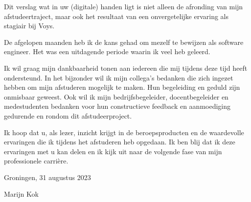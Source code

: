 \documentclass[../report.tex]{subfiles}
\begin{document}
Dit verslag wat in uw (digitale) handen ligt is niet alleen de afronding van mijn afstudeertraject, maar ook het resultaat van een onvergetelijke ervaring als stagiair bij Voys.

De afgelopen maanden heb ik de kans gehad om mezelf te bewijzen als software engineer. Het was een uitdagende periode waarin ik veel heb geleerd.

Ik wil graag mijn dankbaarheid tonen aan iedereen die mij tijdens deze tijd heeft ondersteund. In het bijzonder wil ik mijn collega's bedanken die zich ingezet hebben om mijn afstuderen mogelijk te maken. Hun begeleiding en geduld zijn onmisbaar geweest. Ook wil ik mijn bedrijfsbegeleider, docentbegeleider en medestudenten bedanken voor hun constructieve feedback en aanmoediging gedurende en rondom dit afstudeerproject.

Ik hoop dat u, als lezer, inzicht krijgt in de beroepsproducten en de waardevolle ervaringen die ik tijdens het afstuderen heb opgedaan. Ik ben blij dat ik deze ervaringen met u kan delen en ik kijk uit naar de volgende fase van mijn professionele carrière.

\vspace{\baselineskip}

\noindent Groningen, 31 augustus 2023

\noindent Marijn Kok
\end{document}
